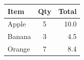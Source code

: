 \begin{table}[htbp]
\centering
\begin{tabular}{|l|c|r|}
\hline
Item & Qty & Total \\
\hline
Apple & 5 & 10.0 \\
Banana & 3 & 4.5 \\
Orange & 7 & 8.4 \\
\hline
\end{tabular}
\end{table}
